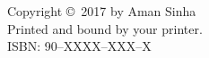 {\pagestyle{empty}

\clearpage
\par\vskip 2cm
\begin{center}
\par\vspace {2cm}
\fublogo{14cm}
\end{center}

\vfill

%
\noindent%
Copyright \copyright\ 2017 by Aman Sinha\\[2ex] %
Printed and bound by your printer.\\[2ex]           %
ISBN: 90--XXXX--XXX--X                              %


\clearpage
} %

